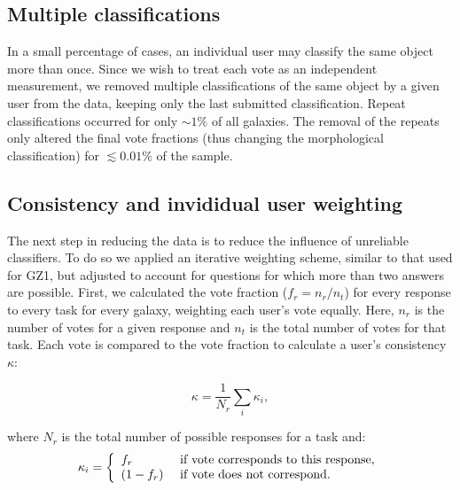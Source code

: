 \documentclass[useAMS,usenatbib]{mn2e}
\begin{document}
\subsection{Multiple classifications}
In a small percentage of cases, an individual user may classify the same object more than once. Since we wish to treat each vote as an independent measurement, we removed multiple classifications of the same object by a given user from the data, keeping only the last submitted classification. Repeat classifications occurred for only $\sim1\%$ of all galaxies. The removal of the repeats only altered the final vote fractions (thus changing the morphological classification) for $\lesssim0.01\%$ of the sample.  

\subsection{Consistency and invididual user weighting}\label{ssec-consistency}

The next step in reducing the data is to reduce the influence of unreliable classifiers. To do so we applied an iterative weighting scheme, similar to that used for GZ1, but adjusted to account for questions for which more than two answers are possible. First, we calculated the vote fraction ($f_r = n_{r}/n_{t}$) for every response to every task for every galaxy, weighting each user's vote equally. Here, $n_r$ is the number of votes for a given response and $n_{t}$ is the total number of votes for that task. Each vote is compared to the vote fraction to calculate a user's consistency $\kappa$:

\begin{equation}
\kappa = \frac{1}{N_r}\sum_i{\kappa_i},
\label{eqn-consistency}
\end{equation}

where $N_r$ is the total number of possible responses for a task and: 
\begin{equation}
    \kappa_i = \left\{
    \begin{array}{l l}
      f_r       & \text{ if vote corresponds to this response,} \\
      (1 - f_r) & \text{ if vote does not correspond.}\\
    \end{array} \right.
    \label{eqn-consistency2}
 \end{equation}
\end{document}
